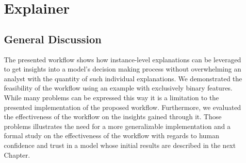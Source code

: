 \chapter{Explainer}
\label{chap:explainer}


\section{General Discussion}
The presented workflow \cite{explainer} shows how instance-level explanations can be leveraged to get insights into a model's decision making process without overwhelming an analyst with the quantity of such individual explanations.
We demonstrated the feasibility of the workflow using an example with exclusively binary features.
While many problems can be expressed this way it is a limitation to the presented implementation of the proposed workflow.
Furthermore, we evaluated the effectiveness of the workflow on the insights gained through it.
Those problems illustrates the need for a more generalizable implementation and a formal study on the effectiveness of the workflow with regards to human confidence and trust in a model whose initial results are described in the next Chapter.


